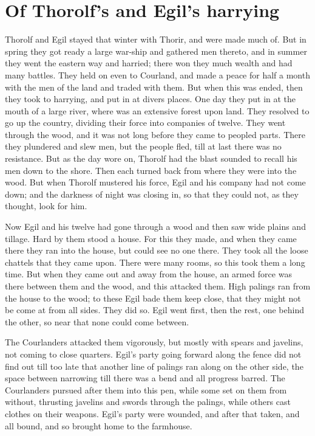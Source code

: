 \chapter{Of Thorolf's and Egil's harrying}

Thorolf and Egil stayed that winter with Thorir, and were made much of. But in spring they got ready a large war-ship and gathered men thereto, and in summer they went the eastern way and harried; there won they much wealth and had many battles. They held on even to Courland, and made a peace for half a month with the men of the land and traded with them. But when this was ended, then they took to harrying, and put in at divers places. One day they put in at the mouth of a large river, where was an extensive forest upon land. They resolved to go up the country, dividing their force into companies of twelve. They went through the wood, and it was not long before they came to peopled parts. There they plundered and slew men, but the people fled, till at last there was no resistance. But as the day wore on, Thorolf had the blast sounded to recall his men down to the shore. Then each turned back from where they were into the wood. But when Thorolf mustered his force, Egil and his company had not come down; and the darkness of night was closing in, so that they could not, as they thought, look for him.

Now Egil and his twelve had gone through a wood and then saw wide plains and tillage. Hard by them stood a house. For this they made, and when they came there they ran into the house, but could see no one there. They took all the loose chattels that they came upon. There were many rooms, so this took them a long time. But when they came out and away from the house, an armed force was there between them and the wood, and this attacked them. High palings ran from the house to the wood; to these Egil bade them keep close, that they might not be come at from all sides. They did so. Egil went first, then the rest, one behind the other, so near that none could come between.

The Courlanders attacked them vigorously, but mostly with spears and javelins, not coming to close quarters. Egil's party going forward along the fence did not find out till too late that another line of palings ran along on the other side, the space between narrowing till there was a bend and all progress barred. The Courlanders pursued after them into this pen, while some set on them from without, thrusting javelins and swords through the palings, while others cast clothes on their weapons. Egil's party were wounded, and after that taken, and all bound, and so brought home to the farmhouse.

